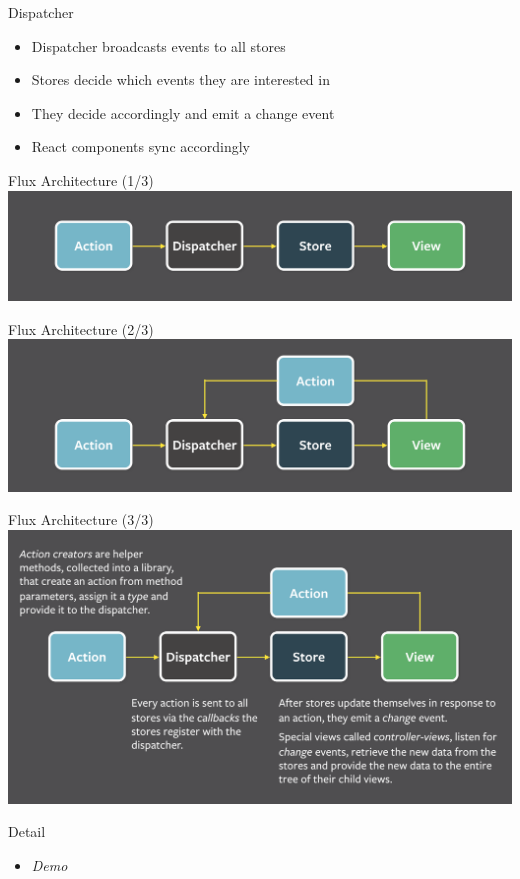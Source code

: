\documentclass[presentation]{beamer}
\begin{document}
\begin{frame}[label=sec-5]{Dispatcher}
\begin{itemize}
\item Dispatcher broadcasts events to all stores
\item Stores decide which events they are interested in
\item They decide accordingly and emit a change event
\item React components sync accordingly
\end{itemize}
\end{frame}

\begin{frame}[label=sec-6]{Flux Architecture (1/3)}
\includegraphics[width=.9\linewidth]{./flux1.png}
\end{frame}



\begin{frame}[label=sec-7]{Flux Architecture (2/3)}
\includegraphics[width=.9\linewidth]{./flux2.png}
\end{frame}
\begin{frame}[label=sec-8]{Flux Architecture (3/3)}
\includegraphics[width=.9\linewidth]{./flux3.png}
\end{frame}
\begin{frame}[label=sec-9]{Detail}
\begin{itemize}
\item \emph{Demo}
\end{itemize}
\end{frame}
\end{document}
